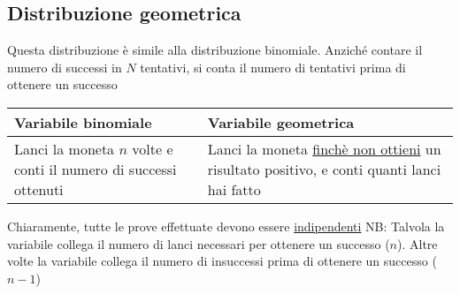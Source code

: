 \subsection{Distribuzione geometrica}
\label{vageometrica}
Questa distribuzione è simile alla distribuzione binomiale. Anziché contare il numero di successi in $ N $ tentativi, si conta il numero di tentativi prima di ottenere un successo
\begin{table}[h!]
	\centering
	\begin{tabular}{|>{\centering\arraybackslash}p{} >{\centering\arraybackslash}p{}|}
		\hline
		Variabile binomiale                                                & Variabile geometrica                                                                                 \\
		\hline
		Lanci la moneta $ n $ volte e conti il numero di successi ottenuti & Lanci la moneta \underline{finchè non ottieni} un risultato positivo, e conti quanti lanci hai fatto \\
		\hline
	\end{tabular}
\end{table}
Chiaramente, tutte le prove effettuate devono essere \underline{indipendenti}
NB: Talvola la variabile collega il numero di lanci necessari per ottenere un successo ($ n $). Altre volte la variabile collega il numero di insuccessi prima di ottenere un successo ($ n-1 $)
